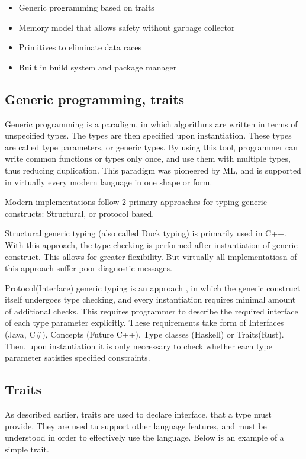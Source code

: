 \begin{itemize}
    \item Generic programming based on traits
    \item Memory model that allows safety without garbage collector
    \item Primitives to eliminate data races
    \item Built in build system and package manager
\end{itemize}

\subsection{Generic programming, traits}
Generic programming is a paradigm, in which algorithms are written in terms of unspecified types.
The types are then specified upon instantiation. These types are called type parameters, or generic types.
By using this tool, programmer can write common functions or types only once, and use them with multiple
types, thus reducing duplication. This paradigm was pioneered by ML, and is supported in virtually every
modern language in one shape or form.

Modern implementations follow 2 primary approaches for typing generic constructs: Structural, or protocol based.

Structural generic typing (also called Duck typing) is primarily used in C++. With this approach, the type
checking is performed after instantiation of generic construct. This allows for greater flexibility.
But virtually all implementatiosn of this approach suffer poor diagnostic messages\cite{Traver:2010:CEM:1863617.1945532}.

Protocol(Interface) generic typing is an approach , in which the generic construct itself undergoes type checking, and
every instantiation requires minimal amount of additional checks. This requires programmer to describe the required interface
of each type parameter explicitly. These requirements take form of Interfaces (Java, C\#), Concepts (Future C++),
Type classes (Haskell) or Traits(Rust). Then, upon instantiation it is only neccessary to check whether
each type parameter satisfies specified constraints.

\subsection{Traits}
As described earlier, traits are used to declare interface, that a type must provide. They are used tu support
other language features, and must be understood in order to effectively use the language.
Below is an example of a simple trait.


